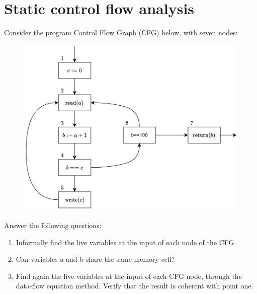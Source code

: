 \section{Static control flow analysis}

Consider the program Control Flow Graph (CFG) below, with seven nodes:
\begin{figure}[H]
    \centering
    \includegraphics[width=0.65\linewidth]{images/CFG.png}
\end{figure} 
Answer the following questions:
\begin{enumerate}
    \item Informally find the live variables at the input of each node of the CFG.
    \item Can variables a and b share the same memory cell?
    \item Find again the live variables at the input of each CFG node, through the data-flow equation method. Verify that the result is coherent with point one. 
\end{enumerate}

